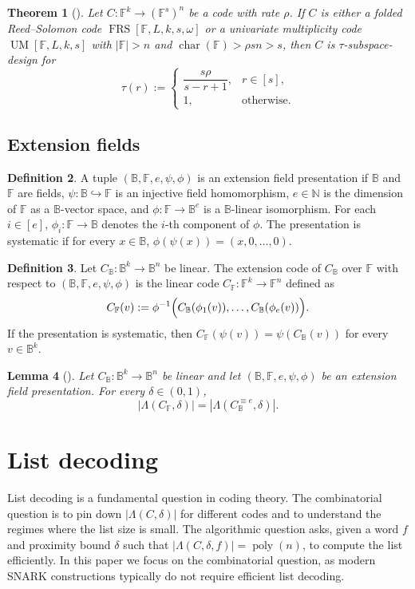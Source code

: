 \documentclass[11pt]{article}
\theoremstyle{plain}
\newtheorem{theorem}{Theorem}[section]
\newtheorem{lemma}[theorem]{Lemma}
\theoremstyle{definition}
\newtheorem{definition}[theorem]{Definition}
\newcommand{\F}{\mathbb{F}}
\newcommand{\B}{\mathbb{B}}
\newcommand{\N}{\mathbb{N}}
\newcommand{\FRS}[5]{\operatorname{FRS}[#1,#2,#3,#4,#5]}
\newcommand{\UM}[4]{\operatorname{UM}[#1,#2,#3,#4]}
\newcommand{\abs}[1]{\left|#1\right|}
\DeclareMathOperator{\poly}{poly}
\DeclareMathOperator{\charop}{char}
\begin{document}
\begin{theorem}[\cite{GK16}]
Let $C:\F^k\to(\F^s)^n$ be a code with rate $\rho$. If $C$ is either a folded Reed--Solomon code $\FRS{\F}{L}{k}{s}{\omega}$ or a univariate multiplicity code $\UM{\F}{L}{k}{s}$ with $\abs{\F}>n$ and $\charop(\F)>\rho sn>s$, then $C$ is $\tau$-subspace-design for
\[
 \tau(r):=
 \begin{cases}
   \dfrac{s\rho}{s-r+1}, & r\in[s],\\[0.6em]
   1, & \text{otherwise.}
 \end{cases}
\]
\end{theorem}

\subsection{Extension fields}

\begin{definition}
A tuple $(\B,\F,e,\psi,\phi)$ is an extension field presentation if $\B$ and $\F$ are fields, $\psi:\B\hookrightarrow\F$ is an injective field homomorphism, $e\in\N$ is the dimension of $\F$ as a $\B$-vector space, and $\phi:\F\to\B^e$ is a $\B$-linear isomorphism. For each $i\in[e]$, $\phi_i:\F\to\B$ denotes the $i$-th component of $\phi$. The presentation is systematic if for every $x\in\B$, $\phi(\psi(x))=(x,0,\ldots,0)$.
\end{definition}

\begin{definition}
Let $C_\B:\B^k\to\B^n$ be linear. The extension code of $C_\B$ over $\F$ with respect to $(\B,\F,e,\psi,\phi)$ is the linear code $C_\F:\F^k\to\F^n$ defined as
\[
  C_\F(v):=\phi^{-1}\Bigl(C_\B(\phi_1(v)),\ldots,C_\B(\phi_e(v))\Bigr).
\]
If the presentation is systematic, then $C_\F(\psi(v))=\psi(C_\B(v))$ for every $v\in\B^k$.
\end{definition}

\begin{lemma}[\cite{BCFW25}]
Let $C_\B:\B^k\to\B^n$ be linear and let $(\B,\F,e,\psi,\phi)$ be an extension field presentation. For every $\delta\in(0,1)$,
\[
  \abs{\Lambda(C_\F,\delta)}=\abs{\Lambda(C_\B^{\equiv e},\delta)}.
\]
\end{lemma}

\section{List decoding}

List decoding \cite{Eli57,Woz58} is a fundamental question in coding theory. The combinatorial question is to pin down $\abs{\Lambda(C,\delta)}$ for different codes and to understand the regimes where the list size is small. The algorithmic question asks, given a word $f$ and proximity bound $\delta$ such that $\abs{\Lambda(C,\delta,f)}=\poly(n)$, to compute the list efficiently. In this paper we focus on the combinatorial question, as modern SNARK constructions typically do not require efficient list decoding.
\end{document}
